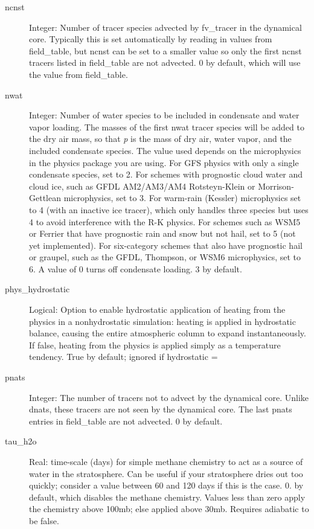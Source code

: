 \documentclass[12pt,letterpaper]{book}
\begin{document}
\begin{description}
\item[ncnst] Integer: Number of tracer species advected by fv\_tracer in the dynamical core. Typically this is set automatically by reading in values from field\_table, but ncnst can be set to a smaller value so only the first ncnst tracers listed in field\_table are not advected. 
0 by default, which will use the value from field\_table. 


\item[nwat] Integer: Number of water species to be included in condensate and water vapor loading. The masses of the first nwat tracer species will be added to the dry air mass, so that \textit{p} is the mass of dry air, water vapor, and the included condensate species. The value used depends on the microphysics in the physics package you are using. For GFS physics with only a single condensate species, set to 2. For schemes with prognostic cloud water and cloud ice, such as GFDL AM2/AM3/AM4 Rotsteyn-Klein or Morrison-Gettlean microphysics, set to 3. For warm-rain (Kessler) microphysics set to 4 (with an inactive ice tracer), which only handles three species but uses 4 to avoid interference with the R-K physics. For schemes such as WSM5 or Ferrier that have prognostic rain and snow but not hail, set to 5 (not yet implemented). For six-category schemes that also have prognostic hail or graupel, such as the GFDL, Thompson, or WSM6 microphysics, set to  6. A value of 0 turns off condensate loading. 3 by default.


\item[phys\_hydrostatic] Logical: Option to enable hydrostatic application of heating from the physics in a nonhydrostatic simulation: heating is applied in hydrostatic balance, causing the entire atmospheric column to expand instantaneously. If false, heating from the physics is applied simply as a temperature tendency. True by default; ignored if hydrostatic 
=\true 


\item[pnats] Integer: The number of tracers not to advect by the dynamical core. Unlike dnats, these tracers are not seen by the dynamical core. The last pnats entries in field\_table are not advected. 
0 by default.


\item[tau\_h2o] Real: time-scale (days) for simple methane chemistry to act as a source of water in the stratosphere. Can be useful if your stratosphere dries out too quickly; consider a value between 
60 and 120 days if this is the case. 0. by default, which disables the methane chemistry. Values less than zero apply the chemistry above 
100{\nobreakspace}mb; else applied above 30{\nobreakspace}mb. Requires adiabatic to be false. 



\end{description}
\end{document}
